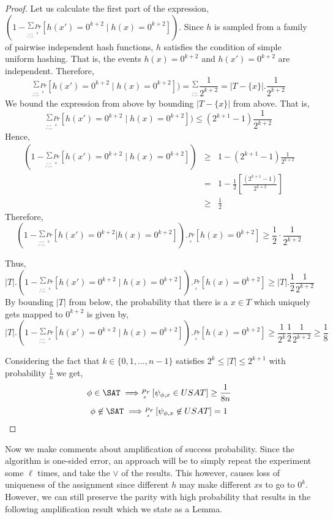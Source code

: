 \begin{proof}
Let us calculate the first part of the expression, $(1-\stackrel{\sum}{_{_{_{_{\stackrel{x' \in T}{x' \neq x}}}}}}\stackrel{Pr}{_{_{_{h}}}}[h(x')=0^{k+2} \mid h(x)=0^{k+2}])$. Since $h$ is sampled from a family of pairwise independent hash functions, $h$ satisfies the condition of simple uniform hashing. That is, the events $h(x)=0^{k+2}$ and $h(x')=0^{k+2}$ are independent. Therefore,
\[
\stackrel{\sum}{_{_{_{_{\stackrel{x' \in T}{x' \neq x}}}}}}\stackrel{Pr}{_{_{_{h}}}}[h(x')=0^{k+2} \mid h(x)=0^{k+2}])=\stackrel{\sum}{_{_{_{_{\stackrel{x' \in T}{x' \neq x}}}}}}\frac{1}{2^{k+2}}= |T-\{x\}|.\frac{1}{2^{k+2}}
\]
We bound the expression from above by bounding $|T-\{x\}|$ from above. That is,
\[
\stackrel{\sum}{_{_{_{_{\stackrel{x' \in T}{x' \neq x}}}}}}\stackrel{Pr}{_{_{_{h}}}}[h(x')=0^{k+2}\mid h(x)=0^{k+2}]) \leq (2^{k+1}-1) \frac{1}{2^{k+2}}
\]
Hence, 
\begin{eqnarray*}
(1-\stackrel{\sum}{_{_{_{_{\stackrel{x' \in T}{x' \neq x}}}}}}\stackrel{Pr}{_{_{_{h}}}}[h(x')=0^{k+2}\mid h(x)=0^{k+2}]) 
& \geq & 1-(2^{k+1}-1)\frac{1}{2^{k+2}} \\
& = & 1-\frac{1}{2}[\frac{(2^{k+1}-1)}{2^{k+2}}] \\
& \geq & \frac{1}{2}
\end{eqnarray*}
Therefore, 
\[
(1-\stackrel{\sum}{_{_{_{_{\stackrel{x' \in T}{x' \neq x}}}}}}\stackrel{Pr}{_{_{_{h}}}}[h(x')=0^{k+2}|h(x)=0^{k+2}]).\stackrel{Pr}{_{_{_{h}}}}[h(x)=0^{k+2}]\geq \frac{1}{2}\cdot \frac{1}{2^{k+2}}
\]

Thus, 
\[
|T|.(1-\stackrel{\sum}{_{_{_{_{\stackrel{x' \in T}{x' \neq x}}}}}}\stackrel{Pr}{_{_{_{h}}}}[h(x')=0^{k+2}\mid h(x)=0^{k+2}]).\stackrel{Pr}{_{_{_{h}}}}[h(x)=0^{k+2}] \geq  |T|.\frac{1}{2}\frac{1}{2^{k+2}} 
\]
By bounding $|T|$ from below, the probability that there is a $x \in T$ which uniquely gets mapped to $0^{k+2}$ is given by,
\[
|T|.(1-\stackrel{\sum}{_{_{_{_{\stackrel{x' \in T}{x' \neq x}}}}}}\stackrel{Pr}{_{_{_{h}}}}[h(x')=0^{k+2}\mid h(x)=0^{k+2}]).\stackrel{Pr}{_{_{_{h}}}}[h(x)=0^{k+2}]\geq\frac{1}{2^{k}}\frac{1}{2}\frac{1}{2^{k+2}} \geq \frac{1}{8}
\]

Considering the fact that $k \in \{0,1,...,n-1\}$ satisfies $2^k \leq |T| \leq 2^{k+1}$ with probability $\frac{1}{n}$ we get,
\[
\phi \in \SAT \implies \stackrel{Pr}{_{_{_{x}}}}[\psi_{\phi,x} \in USAT] \geq \frac{1}{8n}
\]
\[
\phi \not\in \SAT \implies \stackrel{Pr}{_{_{_{x}}}}[\psi_{\phi,x} \not\in USAT] = 1
\]
\end{proof}

Now we make comments about amplification of success probability. Since the algorithm is one-sided error, an approach will be to simply repeat the experiment some $\ell$ times, and take the $\lor$ of the results. This however, causes loss of uniqueness of the assignment since different $h$ may make different $x$s to go to $0^k$. However, we can still preserve the parity with high probability that results in the following amplification result which we state as a Lemma.

